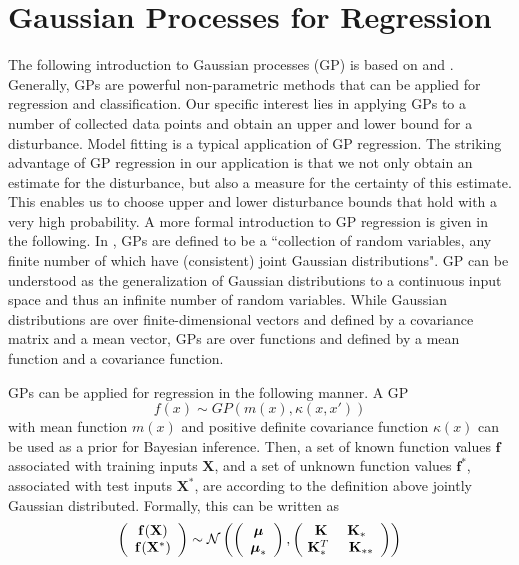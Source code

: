 \documentclass[../main.tex]{subfiles}
\begin{document}
\section{Gaussian Processes for Regression}
The following introduction to Gaussian processes (GP) is based on \cite{murphy2012machine} and \cite{rasmussen2006gaussian}. Generally, GPs are powerful non-parametric methods that can be applied for regression and classification. Our specific interest lies in applying GPs to a number of collected data points and obtain an upper and lower bound for a disturbance. Model fitting is a typical application of GP regression. The striking advantage of GP regression in our application is that we not only obtain an estimate for the disturbance, but also a measure for the certainty of this estimate. This enables us to choose upper and lower disturbance bounds that hold with a very high probability. A more formal introduction to GP regression is given in the following. In \cite{rasmussen2006gaussian}, GPs are defined to be a ``collection of random variables, any finite number of which have (consistent) joint Gaussian distributions". GP can be understood as the generalization of Gaussian distributions to a continuous input space and thus an infinite number of random variables. While Gaussian distributions are over finite-dimensional vectors and defined by a covariance matrix and a mean vector, GPs are over functions and defined by a mean function and a covariance function.\par
GPs can be applied for regression in the following manner. A GP 
\begin{equation}
    f(x) \sim GP(m(x),\kappa(x,x'))
\end{equation}
with mean function $m(x)$ and positive definite covariance function $\kappa(x)$ can be used as a prior for Bayesian inference. Then, a set of known function values $\mathbf{f}$ associated with training inputs $\mathbf{X}$, and a set of unknown function values $\mathbf{f^*}$, associated with test inputs $\mathbf{X^*}$, are according to the definition above jointly Gaussian distributed. Formally, this can be written as
\begin{equation}
    \left(
    \begin{array}{c}
      \mathbf{f(\mathbf{X})} \\\mathbf{f(\mathbf{X^*})}
    \end{array}
 \right) \sim \mathcal{N}
 \left(\left( 
  \begin{array}{c}
  \boldsymbol{\mu} \\ \boldsymbol{\mu}_* 
  \end{array}
  \right),
  \left(\!
  \begin{array}{c}
  \mathbf{K} \hspace{0.5cm} \mathbf{K}_* \\
  \mathbf{K}^T_* \hspace{0.5cm} \mathbf{K}_{**}  
  \end{array}
  \right)
  \right)
\end{equation}
\end{document}

